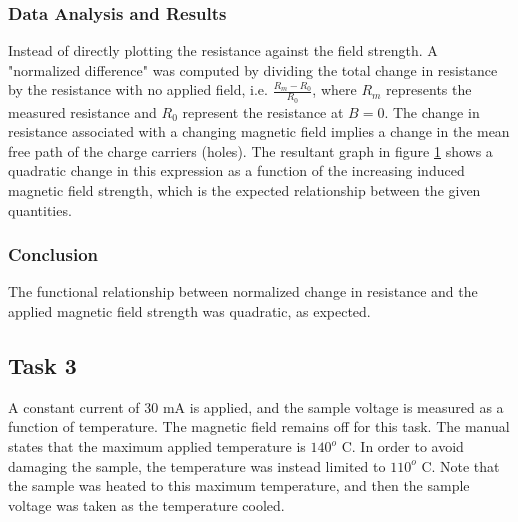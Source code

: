 \documentclass[a4paper]{article}
\begin{document}
\subsubsection{Data Analysis and Results}
\qq Instead of directly plotting the resistance against the field
strength. A "normalized difference" was computed by dividing the total
change in resistance by the resistance with no applied field,
i.e. $\frac{R_m - R_0}{R_0}$, where $R_m$ represents the measured
resistance and $R_0$ represent the resistance at $B=0$. The change in
resistance associated with a changing magnetic field implies a change
in the mean free path of the charge carriers (holes). The resultant
graph in figure \ref{task22plot} shows a quadratic change in this
expression as a function of the increasing induced magnetic field
strength, which is the expected relationship between the given
quantities.

\begin{figure}[H]
\centering
\label{task22plot}
\end{figure}

\subsubsection{Conclusion}
\qq The functional relationship between normalized change in resistance
and the applied magnetic field strength was quadratic, as expected.

\subsection{Task 3}

\qq A constant current of 30 mA is applied, and the sample voltage is
measured as a function of temperature. The magnetic field remains off
for this task. The manual states that the maximum applied temperature
is $140^o$ C. In order to avoid damaging the sample, the temperature
was instead limited to $110^o$ C. Note that the sample was heated to
this maximum temperature, and then the sample voltage was taken as the
temperature cooled.
\end{document}
